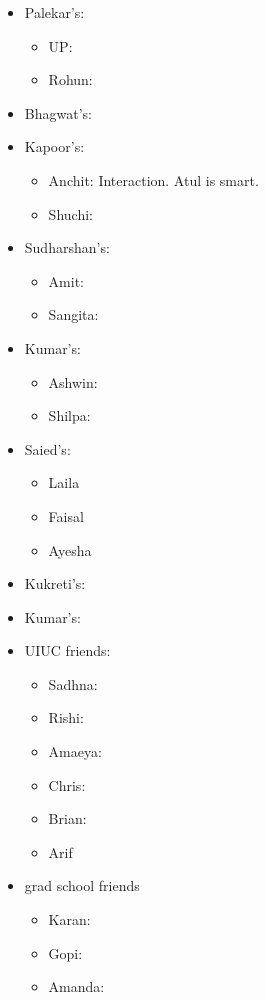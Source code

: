     \begin{itemize} 
    \item Palekar’s:  
      \begin{itemize}
      \item UP: 
      \item Rohun: 
      \end{itemize} 
    \item Bhagwat’s: 
    \item Kapoor’s: 
      \begin{itemize}
        \tiny \item \tiny Anchit: Interaction. Atul is smart. 
      \item \tiny Shuchi: 
      \end{itemize}
    \item Sudharshan’s: 
      \begin{itemize} 
        \tiny \item \tiny Amit:  
      \item \tiny Sangita:  
      \end{itemize}
    \item Kumar’s:
      \begin{itemize}
        \tiny \item \tiny Ashwin: 
      \item \tiny Shilpa: 
      \end{itemize}
    \item Saied’s: 
      \begin{itemize}
        \tiny \item \tiny Laila 
      \item \tiny Faisal 
      \item \tiny Ayesha
      \end{itemize} 
    \item Kukreti’s:
    \item Kumar’s:
    \item UIUC friends: 
      \begin{itemize} 
        \tiny \item \tiny Sadhna: 
      \item \tiny Rishi: 
      \item \tiny Amaeya: 
      \item \tiny Chris: 
      \item \tiny Brian: 
      \item \tiny Arif 
      \end{itemize}
    \item grad school friends 
      \begin{itemize} 
        \tiny \item \tiny  Karan: 
      \item \tiny Gopi: 
      \item \tiny Amanda:  
      \end{itemize}
    \end{itemize} 

